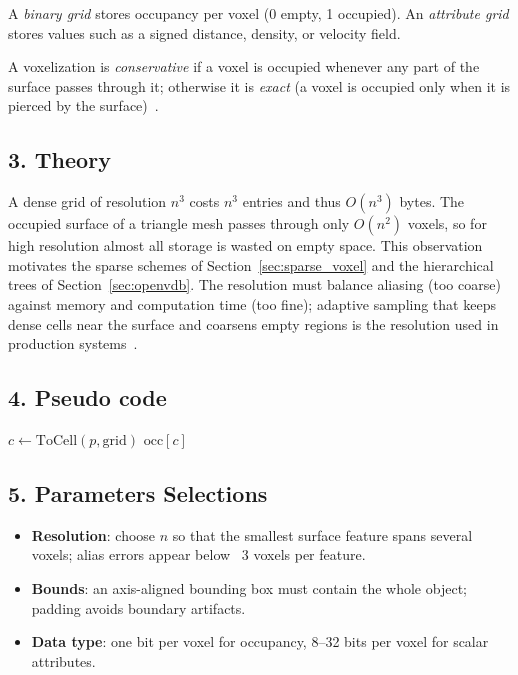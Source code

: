 \begin{definition}\label{def:binary_grid}
A \emph{binary grid} stores occupancy per voxel (0 empty, 1 occupied). An
\emph{attribute grid} stores values such as a signed distance, density, or
velocity field.
\end{definition}

\begin{definition}\label{def:conservative_vox}
A voxelization is \emph{conservative} if a voxel is occupied whenever any
part of the surface passes through it; otherwise it is \emph{exact} (a voxel
is occupied only when it is pierced by the surface)~\cite{nooruddin2003}.
\end{definition}

\subsection{3. Theory}
A dense grid of resolution $n^3$ costs $n^3$ entries and thus $O(n^3)$ bytes.
The occupied surface of a triangle mesh passes through only $O(n^2)$ voxels,
so for high resolution almost all storage is wasted on empty space. This
observation motivates the sparse schemes of
Section~\ref{sec:sparse_voxel} and the hierarchical trees of
Section~\ref{sec:openvdb}. The resolution must balance aliasing (too coarse)
against memory and computation time (too fine); adaptive sampling that keeps
dense cells near the surface and coarsens empty regions is the resolution
used in production systems~\cite{museth2013}.

\subsection{4. Pseudo code}
\begin{algorithmic}
    \State $c \gets \mathrm{ToCell}(p, \mathrm{grid})$
    \State \Return $\mathrm{occ}[c]$
\EndFunction
\end{algorithmic}

\subsection{5. Parameters Selections}
\begin{itemize}
    \item \textbf{Resolution}: choose $n$ so that the smallest surface feature spans several voxels; alias errors appear below ~3 voxels per feature.
    \item \textbf{Bounds}: an axis-aligned bounding box must contain the whole object; padding avoids boundary artifacts.
    \item \textbf{Data type}: one bit per voxel for occupancy, 8--32 bits per voxel for scalar attributes.
\end{itemize}

